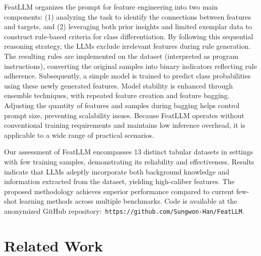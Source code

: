 \textsf{FeatLLM} organizes the prompt for feature engineering into two main components: (1) analyzing the task to identify the connections between features and targets, and (2) leveraging both prior insights and limited exemplar data to construct rule-based criteria for class differentiation. By following this sequential reasoning strategy, the LLMs exclude irrelevant features during rule generation. The resulting rules are implemented on the dataset (interpreted as program instructions), converting the original samples into binary indicators reflecting rule adherence. Subsequently, a simple model is trained to predict class probabilities using these newly generated features. Model stability is enhanced through ensemble techniques, with repeated feature creation and feature bagging. Adjusting the quantity of features and samples during bagging helps control prompt size, preventing scalability issues. Because \textsf{FeatLLM} operates without conventional training requirements and maintains low inference overhead, it is applicable to a wide range of practical scenarios.

Our assessment of \textsf{FeatLLM} encompasses 13 distinct tabular datasets in settings with few training samples, demonstrating its reliability and effectiveness. Results indicate that LLMs adeptly incorporate both background knowledge and information extracted from the dataset, yielding high-caliber features. The proposed methodology achieves superior performance compared to current few-shot learning methods across multiple benchmarks. Code is available at the anonymized GitHub repository:~\texttt{https://github.com/Sungwon-Han/FeatLLM}.

\section{Related Work}

